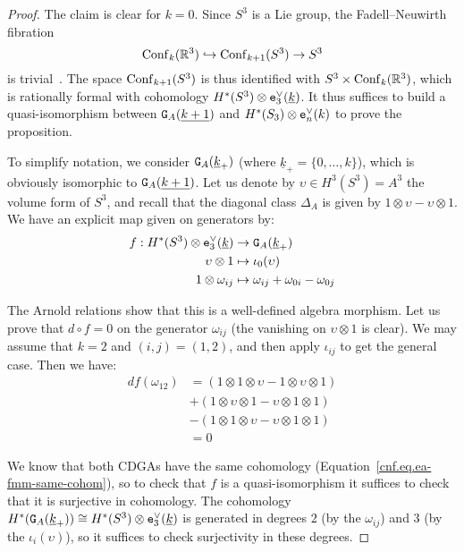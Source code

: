 \begin{proof}
  The claim is clear for $k = 0$.
  Since $S^{3}$ is a Lie  group, the Fadell--Neuwirth fibration
  \[ \Conf_{k}(\R^{3}) \hookrightarrow \Conf_{k+1}(S^{3}) \to S^{3} \]
  is trivial~\cite[Theorem 4]{FadellNeuwirth1962}.
  The space $\Conf_{k+1}(S^{3})$ is thus identified with $S^{3} \times \Conf_{k}(\R^{3})$, which is rationally formal with cohomology $H^{*}(S^{3}) \otimes \enV[3](\underline{k})$.
  It thus suffices to build a quasi-isomorphism between $\GG{A}(\underline{k+1})$ and $H^{*}(S_{3}) \otimes \enV(k)$ to prove the proposition.

  To simplify notation, we consider $\GG{A}(\underline{k}_{+})$ (where $\underline{k}_{+} = \{ 0, \dots, k \}$), which is obviously isomorphic to $\GG{A}(\underline{k+1})$.
  Let us denote by $\upsilon \in H^{3}(S^{3}) = A^{3}$ the volume form of $S^{3}$, and recall that the diagonal class $\Delta_{A}$ is given by $1 \otimes \upsilon - \upsilon \otimes 1$.
  We have an explicit map given on generators by:
  \begin{align*}
    f : H^{*}(S^{3}) \otimes \enV[3](\underline{k})
    & \to \GG{A}(\underline{k}_{+}) \\
    \upsilon \otimes 1
    & \mapsto \iota_{0}(\upsilon) \\
    1 \otimes \omega_{ij}
    & \mapsto \omega_{ij} + \omega_{0i} - \omega_{0j}
  \end{align*}

  The Arnold relations show that this is a well-defined algebra morphism.
  Let us prove that $d \circ f = 0$ on the generator $\omega_{ij}$ (the vanishing on $\upsilon \otimes 1$ is clear).
  We may assume that $k = 2$ and $(i,j) = (1,2)$, and then apply $\iota_{ij}$ to get the general case.
  Then we have:
  \begin{align*}
    df(\omega_{12}) & = (1 \otimes 1 \otimes \upsilon - 1 \otimes \upsilon \otimes 1) \\
               & + (1 \otimes \upsilon \otimes 1 - \upsilon \otimes 1 \otimes 1) \\
               & - (1 \otimes 1 \otimes \upsilon - \upsilon \otimes 1 \otimes 1) \\
               & = 0
  \end{align*}

  We know that both CDGAs have the same cohomology (Equation~\eqref{cnf.eq.ea-fmm-same-cohom}), so to check that $f$ is a quasi-isomorphism it suffices to check that it is surjective in cohomology.
  The cohomology $H^{*}(\GG{A}(\underline{k}_{+})) \cong H^{*}(S^{3}) \otimes \enV[3](\underline{k})$ is generated in degrees $2$ (by the $\omega_{ij}$) and $3$ (by the $\iota_{i}(\upsilon)$), so it suffices to check surjectivity in these degrees.


\end{proof}
